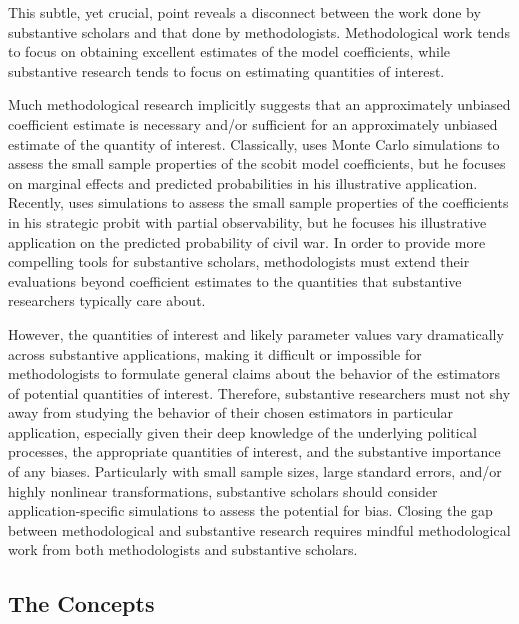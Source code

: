 \documentclass[12pt]{article}
\begin{document}
This subtle, yet crucial, point reveals a disconnect between the work done by substantive scholars and that done by methodologists. 
Methodological work tends to focus on obtaining excellent estimates of the model coefficients, while substantive research tends to focus on estimating quantities of interest. 

Much methodological research implicitly suggests that an approximately unbiased coefficient estimate is necessary and/or sufficient for an approximately unbiased estimate of the quantity of interest. 
Classically, \cite{Nagler1994} uses Monte Carlo simulations to assess the small sample properties of the scobit model coefficients, but he focuses on marginal effects and predicted probabilities in his illustrative application. 
Recently, \cite{Nieman2015} uses simulations to assess the small sample properties of the coefficients in his strategic probit with partial observability, but he focuses his illustrative application on the predicted probability of civil war. 
In order to provide more compelling tools for substantive scholars, methodologists must extend their evaluations beyond coefficient estimates to the quantities that substantive researchers typically care about. 

However, the quantities of interest and likely parameter values vary dramatically across substantive applications, making it difficult or impossible for methodologists to formulate general claims about the behavior of the estimators of potential quantities of interest. 
Therefore, substantive researchers must not shy away from studying the behavior of their chosen estimators in particular application, especially given their deep knowledge of the underlying political processes, the appropriate quantities of interest, and the substantive importance of any biases.
Particularly with small sample sizes, large standard errors, and/or highly nonlinear transformations, substantive scholars should consider application-specific simulations to assess the potential for bias.
Closing the gap between methodological and substantive research requires mindful methodological work from both methodologists and substantive scholars.

\subsection*{The Concepts}
\end{document}
